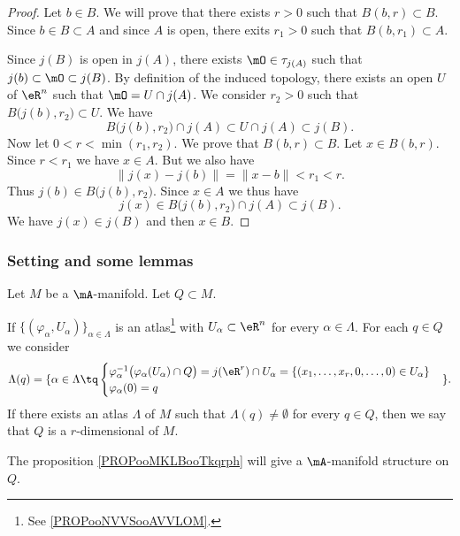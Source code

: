 \begin{proof}
	Let \( b\in B\). We will prove that there exists \( r>0\) such that \( B(b,r)\subset B\). Since \( b\in B\subset A\) and since \( A\) is open, there exits \( r_1>0\) such that \( B(b,r_1)\subset A\).

	Since \( j(B)\) is open in \( j(A)\), there exists \( \mO\in\tau_{j(A)}\) such that \( j(b)\subset\mO\subset j(B)\). By definition of the induced topology, there exists an open \( U\) of \( \eR^n\) such that \( \mO=U\cap j(A)\). We consider \( r_2>0\) such that \( B\big( j(b),r_2 \big)\subset U\). We have
	\begin{equation}
		B\big( j(b),r_2 \big)\cap j(A)\subset U\cap j(A)\subset j(B).
	\end{equation}
	Now let \( 0<r<\min(r_1,r_2)\). We prove that \( B(b,r)\subset B\). Let \( x\in B(b,r)\). Since \( r<r_1\) we have \( x\in A\). But we also have
	\begin{equation}
		\| j(x)-j(b) \|=\| x-b \|<r_1<r.
	\end{equation}
	Thus \( j(b)\in B\big( j(b),r_2 \big)\). Since \( x\in A\) we thus have
	\begin{equation}
		j(x)\in B\big( j(b),r_2 \big)\cap j(A)\subset j(B).
	\end{equation}
	We have \( j(x)\in j(B)\) and then \( x\in B\).
\end{proof}

\subsubsection{Setting and some lemmas}


\begin{definition}[submanifold]      \label{DEFooLQHWooMOTgzq}
	Let \( M\) be a \( \mA\)-manifold. Let \( Q\subset M\).

	If \( \{ (\varphi_{\alpha},U_{\alpha}) \}_{\alpha\in \Lambda}\) is an atlas\footnote{See \ref{PROPooNVVSooAVVLOM}.} with \( U_{\alpha}\subset \eR^n\) for every \( \alpha\in \Lambda\). For each \( q\in Q\) we consider
	\begin{equation}
		\Lambda(q)=\{ \alpha\in\Lambda\tq
		\begin{cases}
			\varphi_{\alpha}^{-1}\big( \varphi_{\alpha}(U_{\alpha})\cap Q \big)= j(\eR^r)\cap U_{\alpha} = \{ (x_1,\ldots,x_r,0,\ldots,0)\in U_{\alpha} \} \\
			\varphi_{\alpha}(0)=q
		\end{cases}
		\}.
	\end{equation}
	If there exists an atlas \( \Lambda\) of \( M\) such that \( \Lambda(q)\neq\emptyset\) for every \( q\in Q\), then we say that \( Q\) is a \( r\)-dimensional  of \( M\).

	The proposition \ref{PROPooMKLBooTkqrph} will give a \( \mA\)-manifold structure on \( Q\).
\end{definition}

